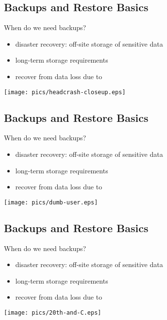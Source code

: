 \documentclass[xga]{xdvislides}
\begin{document}
\subsection{Backups and Restore Basics}
When do we need backups?
\begin{itemize}
	\item disaster recovery: off-site storage of sensitive data
	\item long-term storage requirements
	\item recover from data loss due to
\end{itemize}
\vspace*{\fill}
\begin{center}
	\texttt{[image: pics/headcrash-closeup.eps]}
\end{center}
\vspace*{\fill}

\subsection{Backups and Restore Basics}
When do we need backups?
\begin{itemize}
	\item disaster recovery: off-site storage of sensitive data
	\item long-term storage requirements
	\item recover from data loss due to
\end{itemize}
\vspace*{\fill}
\begin{center}
	\texttt{[image: pics/dumb-user.eps]}
\end{center}
\vspace*{\fill}

\subsection{Backups and Restore Basics}
When do we need backups?
\begin{itemize}
	\item disaster recovery: off-site storage of sensitive data
	\item long-term storage requirements
	\item recover from data loss due to
\end{itemize}
\vspace*{\fill}
\begin{center}
	\texttt{[image: pics/20th-and-C.eps]}
\end{center}
\vspace*{\fill}
\end{document}
